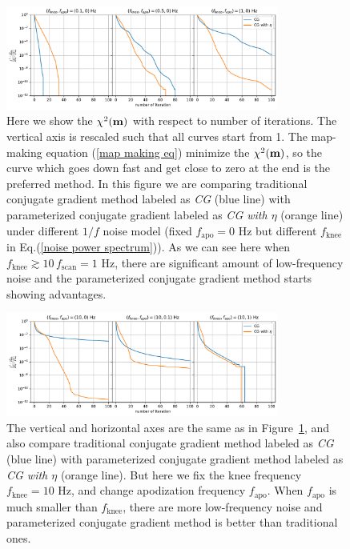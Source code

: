 \documentclass[twocolumn,linenumbers]{aastex631}
\newcommand{\vbm}{\vb{m}}
\begin{document}
\begin{figure}[tb!]
\centering
\includegraphics[width=0.8\textwidth]{pink_noise_chi2.pdf}
\caption{
    Here we show the $\chi^2(\vbm)$ with respect to number of iterations.
    The vertical axis is rescaled  such that all curves start from 1.
    The map-making equation (\ref{map making eq}) minimize the $\chi^2(\vbm)$, so
    the curve which goes down fast and get close to zero at the end is the preferred method.
    In this figure we are comparing traditional conjugate gradient method labeled as \textit{CG} (blue line)
    with parameterized conjugate gradient labeled as \textit{CG with $\eta$} (orange line)
    under different $1/f$ noise model (fixed $f_\text{apo}=0$ Hz but different $f_\text{knee}$ in Eq.(\ref{noise power spectrum})).
    As we can see here when $f_\text{knee} \gtrsim 10\,f_\text{scan} = 1$ Hz, there are significant amount of
    low-frequency noise and the parameterized conjugate gradient method starts showing advantages.
}
\label{1/f noise chi2}
\end{figure}

\begin{figure}[tb!]
\centering
\includegraphics[width=0.8\textwidth]{flattened_noise_chi2.pdf}
\caption{
    The vertical and horizontal axes are the same as in Figure~\ref{1/f noise chi2},
    and also compare traditional conjugate gradient method labeled as \textit{CG} (blue line) 
    with parameterized conjugate gradient method labeled as \textit{CG with $\eta$} (orange line).
    But here we fix the knee frequency $f_\text{knee} = 10$ Hz, and change apodization frequency $f_\text{apo}$.
    When $f_\text{apo}$ is much smaller than $f_\text{knee}$, there are more low-frequency noise and
    parameterized conjugate gradient method is better than traditional ones.
}
\label{apo noise chi2}
\end{figure}
\end{document}

